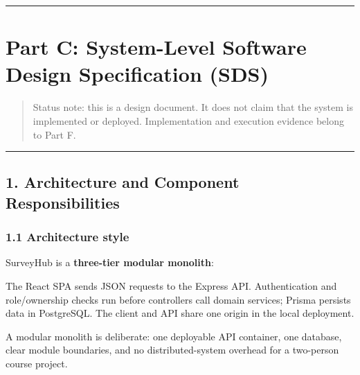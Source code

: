 \documentclass[12pt,a4paper]{article}
\begin{document}
\medskip\noindent\rule{\linewidth}{0.4pt}\medskip


\label{part-b-end}
\clearpage

\section{Part C: System-Level Software Design Specification (SDS)}

\label{part-c-start}


\begin{quote}
Status note: this is a design document. It does not claim that the system is implemented or deployed. Implementation and execution evidence belong to Part F.

\end{quote}

\medskip\noindent\rule{\linewidth}{0.4pt}\medskip

\subsection*{1. Architecture and Component Responsibilities}
\subsubsection*{1.1 Architecture style}
SurveyHub is a \textbf{three-tier modular monolith}:

The React SPA sends JSON requests to the Express API. Authentication and role/ownership checks run before controllers call domain services; Prisma persists data in PostgreSQL. The client and API share one origin in the local deployment.

A modular monolith is deliberate: one deployable API container, one database, clear module boundaries, and no distributed-system overhead for a two-person course project.

\end{document}
